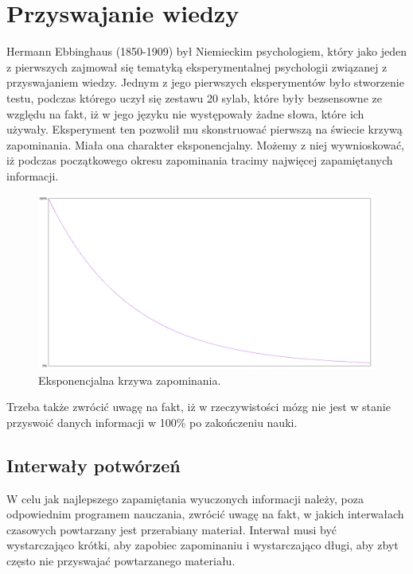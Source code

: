 {\let\cleardoublepage\relax \chapter{Przyswajanie wiedzy}}

Hermann Ebbinghaus\cite{HumanMemory} (1850-1909) był Niemieckim psychologiem, który jako jeden z pierwszych zajmował się tematyką eksperymentalnej psychologii związanej z przyswajaniem wiedzy. 
Jednym z jego pierwszych eksperymentów było stworzenie testu, podczas którego uczył się zestawu 20 sylab, które były bezsensowne ze względu na fakt, iż w jego języku nie występowały żadne słowa, które ich używały.
Eksperyment ten pozwolił mu skonstruować pierwszą na świecie krzywą zapominania. Miała ona charakter eksponencjalny.  Możemy z niej wywnioskować, iż podczas początkowego okresu zapominania tracimy najwięcej zapamiętanych informacji.

\begin{figure}[h]
	\centering
	\includegraphics[width=\textwidth]{images/curve.png}
	 \caption{Eksponencjalna krzywa zapominania.}
\end{figure}

Trzeba także zwrócić uwagę na fakt, iż w rzeczywistości\cite{ForgettingCurve} mózg nie jest w stanie przyswoić danych informacji w 100\% po zakończeniu nauki. 

\section{Interwały potwórzeń}

W celu jak najlepszego zapamiętania wyuczonych informacji należy, poza odpowiednim programem nauczania, zwrócić uwagę na fakt, w jakich interwałach czasowych powtarzany jest przerabiany materiał\cite{ForgettingCurve}.
Interwał musi być wystarczająco krótki, aby zapobiec zapominaniu i wystarczająco długi, aby zbyt często nie przyswajać powtarzanego materiału.



